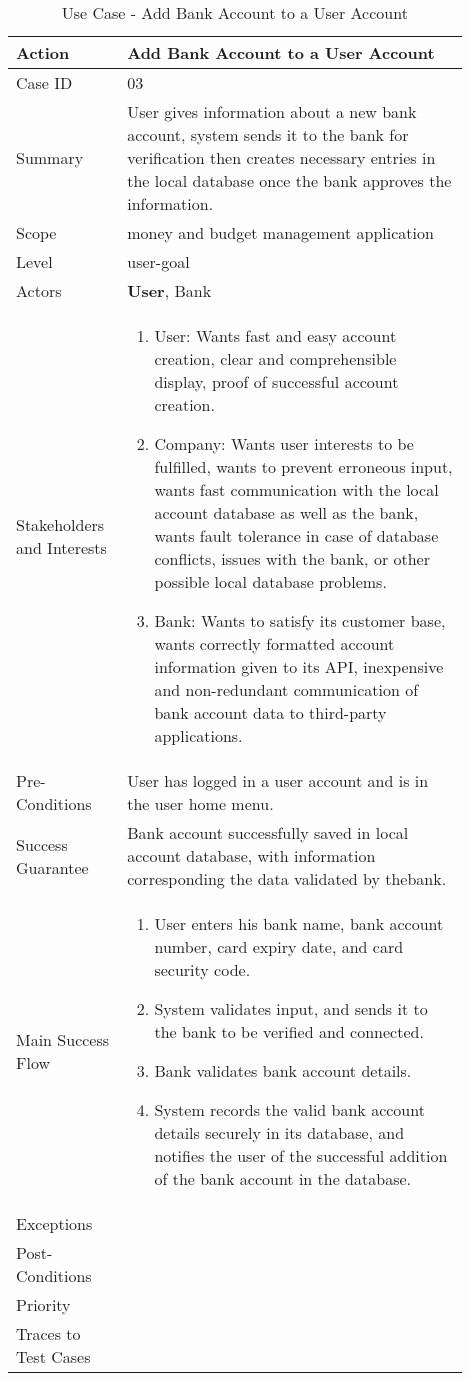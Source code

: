 \documentclass[11pt]{article}
\newcounter{use case ID}
\newcommand\tabularhead[1]{
\begin{table}[ht]
    \addtocounter{use case ID}{1}
    \caption{Use Case \arabic{use case ID} - #1}
    \vspace{0.2cm}
    \begin{tabular}{|p{0.2\linewidth}|p{0.70\linewidth}|}
    \hline
        \textbf{Action} & \textbf{#1} \\
        \hline}
\newcommand\addrow[2]{#1 & #2\\ \hline}
\newcommand\addmulrow[2]{ \begin{minipage}[t][][t]{2.5cm}#1\end{minipage}
        &\begin{minipage}[t][][t]{11cm}
        \begin{enumerate}[itemsep=-1ex] #2   \end{enumerate}
    \end{minipage}\vfill\\ \hline}
\newenvironment{usecase}{\tabularhead}
{\hline\end{tabular}\end{table}}
\begin{document}
\begin{usecase}{Add Bank Account to a User Account}
    \addrow{Case ID}{03}
    \addrow{Summary}{User gives information about a new bank account, system sends it to the bank for verification then creates necessary entries in the local database once the bank approves the information.}
    \addrow{Scope}{money and budget management application}
    \addrow{Level}{user-goal}
    \addrow{Actors}{\textbf{User}, Bank}
    \addmulrow{Stakeholders and Interests}{
        \item User: Wants fast and easy account creation, clear and comprehensible display, proof of successful account creation.
        \item Company: Wants user interests to be fulfilled, wants to prevent erroneous input, wants fast communication with the local account database as well as the bank, wants fault tolerance in case of database conflicts, issues with the bank, or other possible local database problems.
        \item Bank: Wants to satisfy its customer base, wants correctly formatted account information given to its API, inexpensive and non-redundant communication of bank account data to third-party applications.}
    \addrow{Pre-Conditions}{User has logged in a user account and is in the user home menu.}
    \addrow{Success Guarantee}{Bank account successfully saved in local account database, with information corresponding the data validated by thebank.}
    \addmulrow{Main Success Flow}{
        \item User enters his bank name, bank account number, card expiry date, and card security code.
        \item System validates input, and sends it to the bank to be verified and connected.
        \item Bank validates bank account details.
        \item System records the valid bank account details securely in its database, and notifies the user of the successful addition of the bank account in the database.}
    \addrow{Exceptions}{}
    \addrow{Post-Conditions}{}
    \addrow{Priority}{}
    \addrow{Traces to Test Cases}{}
\end{usecase}
\end{document}

